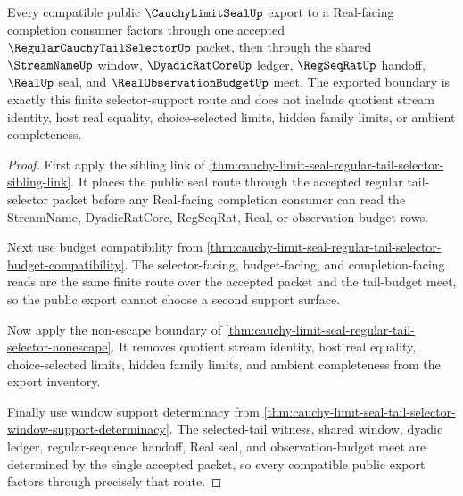 \begin{theorem}
\label{thm:cauchy-limit-seal-regular-tail-selector-public-export}
Every compatible public $\CauchyLimitSealUp$ export to a Real-facing completion consumer factors through one accepted $\RegularCauchyTailSelectorUp$ packet, then through the shared $\StreamNameUp$ window, $\DyadicRatCoreUp$ ledger, $\RegSeqRatUp$ handoff, $\RealUp$ seal, and $\RealObservationBudgetUp$ meet. The exported boundary is exactly this finite selector-support route and does not include quotient stream identity, host real equality, choice-selected limits, hidden family limits, or ambient completeness.
\end{theorem}
\begin{proof}
First apply the sibling link of \autoref{thm:cauchy-limit-seal-regular-tail-selector-sibling-link}. It places the public seal route through the accepted regular tail-selector packet before any Real-facing completion consumer can read the StreamName, DyadicRatCore, RegSeqRat, Real, or observation-budget rows.

Next use budget compatibility from \autoref{thm:cauchy-limit-seal-regular-tail-selector-budget-compatibility}. The selector-facing, budget-facing, and completion-facing reads are the same finite route over the accepted packet and the tail-budget meet, so the public export cannot choose a second support surface.

Now apply the non-escape boundary of \autoref{thm:cauchy-limit-seal-regular-tail-selector-nonescape}. It removes quotient stream identity, host real equality, choice-selected limits, hidden family limits, and ambient completeness from the export inventory.

Finally use window support determinacy from \autoref{thm:cauchy-limit-seal-tail-selector-window-support-determinacy}. The selected-tail witness, shared window, dyadic ledger, regular-sequence handoff, Real seal, and observation-budget meet are determined by the single accepted packet, so every compatible public export factors through precisely that route.
\end{proof}

